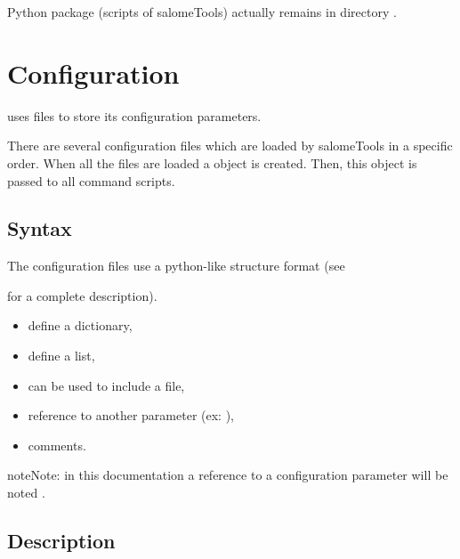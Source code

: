 \documentclass[a4paper,10pt,english]{sphinxmanual}
\begin{document}
Python package (scripts of salomeTools) actually remains in directory .


\section{Configuration}
\label{\detokenize{configuration:configuration}}\label{\detokenize{configuration::doc}}
 uses files to store its configuration parameters.

There are several configuration files which are loaded by salomeTools in a specific order.
When all the files are loaded a  object is created.
Then, this object is passed to all command scripts.


\subsection{Syntax}
\label{\detokenize{configuration:syntax}}
The configuration files use a python-like structure format
(see %
\begin{footnote}[3]\sphinxAtStartFootnote
{}
%
\end{footnote} for a complete description).
\begin{itemize}
\item {} 
\sphinxstylestrong{\{\}} define a dictionary,

\item {} 
\sphinxstylestrong{{[}{]}} define a list,

\item {} 
 can be used to include a file,

\item {} 
 reference to another parameter (ex: ),

\item {} 
\sphinxstylestrong{\#} comments.

\end{itemize}

\begin{sphinxadmonition}{note}{Note:}
in this documentation a reference to a configuration parameter will be noted .
\end{sphinxadmonition}


\subsection{Description}
\label{\detokenize{configuration:description}}
\end{document}
